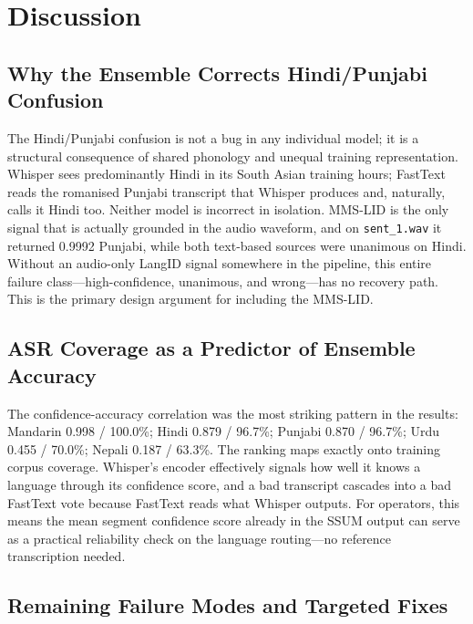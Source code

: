 \documentclass[12pt, onecolumn]{IEEEtran}
\begin{document}
\section{Discussion}

\subsection{Why the Ensemble Corrects Hindi/Punjabi Confusion}

The Hindi/Punjabi confusion is not a bug in any individual model; it is a structural consequence of shared phonology and unequal training representation. Whisper sees predominantly Hindi in its South Asian training hours; FastText reads the romanised Punjabi transcript that Whisper produces and, naturally, calls it Hindi too. Neither model is incorrect in isolation. MMS-LID is the only signal that is actually grounded in the audio waveform, and on \texttt{sent\_1.wav} it returned 0.9992 Punjabi, while both text-based sources were unanimous on Hindi. Without an audio-only LangID signal somewhere in the pipeline, this entire failure class---high-confidence, unanimous, and wrong---has no recovery path. This is the primary design argument for including the MMS-LID.

\subsection{ASR Coverage as a Predictor of Ensemble Accuracy}

The confidence-accuracy correlation was the most striking pattern in the results: Mandarin 0.998 / 100.0\%; Hindi 0.879 / 96.7\%; Punjabi 0.870 / 96.7\%; Urdu 0.455 / 70.0\%; Nepali 0.187 / 63.3\%. The ranking maps exactly onto training corpus coverage. Whisper's encoder effectively signals how well it knows a language through its confidence score, and a bad transcript cascades into a bad FastText vote because FastText reads what Whisper outputs. For operators, this means the mean segment confidence score already in the SSUM output can serve as a practical reliability check on the language routing---no reference transcription needed.

\subsection{Remaining Failure Modes and Targeted Fixes}
\label{sec:gurmukhi}
\end{document}
